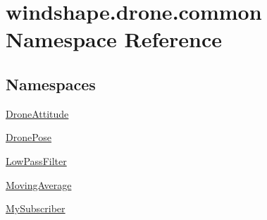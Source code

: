 \hypertarget{namespacewindshape_1_1drone_1_1common}{}\section{windshape.\+drone.\+common Namespace Reference}
\label{namespacewindshape_1_1drone_1_1common}
\subsection*{Namespaces}
\begin{DoxyCompactItemize}
\item 
 \mbox{\hyperlink{namespacewindshape_1_1drone_1_1common_1_1_drone_attitude}{Drone\+Attitude}}
\item 
 \mbox{\hyperlink{namespacewindshape_1_1drone_1_1common_1_1_drone_pose}{Drone\+Pose}}
\item 
 \mbox{\hyperlink{namespacewindshape_1_1drone_1_1common_1_1_low_pass_filter}{Low\+Pass\+Filter}}
\item 
 \mbox{\hyperlink{namespacewindshape_1_1drone_1_1common_1_1_moving_average}{Moving\+Average}}
\item 
 \mbox{\hyperlink{namespacewindshape_1_1drone_1_1common_1_1_my_subscriber}{My\+Subscriber}}
\end{DoxyCompactItemize}
